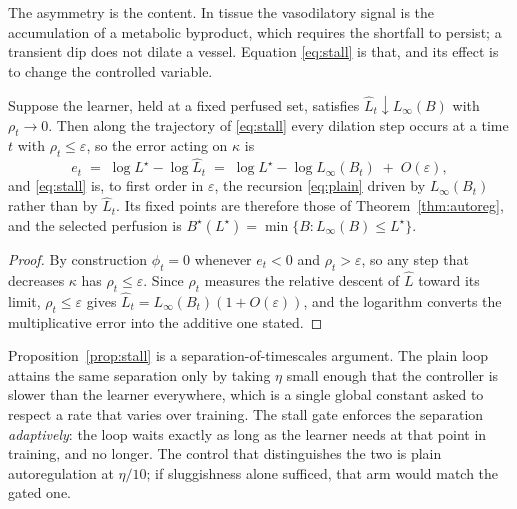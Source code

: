 The asymmetry is the content. In tissue the vasodilatory signal is the accumulation of a
metabolic byproduct, which requires the shortfall to persist; a transient dip does not
dilate a vessel. Equation \eqref{eq:stall} is that, and its effect is to change the
controlled variable.

\begin{proposition}
\label{prop:stall}
Suppose the learner, held at a fixed perfused set, satisfies
$\widehat{L}_t \downarrow L_\infty(B)$ with $\rho_t \to 0$. Then along the trajectory of
\eqref{eq:stall} every dilation step occurs at a time $t$ with $\rho_t \le
\varepsilon$, so the error acting on $\kappa$ is
\begin{equation}
  e_t \;=\; \log L^\star - \log \widehat{L}_t
  \;=\; \log L^\star - \log L_\infty(B_t) \;+\; O(\varepsilon),
\end{equation}
and \eqref{eq:stall} is, to first order in $\varepsilon$, the recursion
\eqref{eq:plain} driven by $L_\infty(B_t)$ rather than by $\widehat{L}_t$. Its fixed
points are therefore those of Theorem~\ref{thm:autoreg}, and the selected perfusion is
$B^\star(L^\star) = \min\{B : L_\infty(B) \le L^\star\}$.
\end{proposition}

\begin{proof}
By construction $\phi_t = 0$ whenever $e_t < 0$ and $\rho_t > \varepsilon$, so any step
that decreases $\kappa$ has $\rho_t \le \varepsilon$. Since $\rho_t$ measures the
relative descent of $\widehat{L}$ toward its limit, $\rho_t \le \varepsilon$ gives
$\widehat{L}_t = L_\infty(B_t)(1 + O(\varepsilon))$, and the logarithm converts the
multiplicative error into the additive one stated.
\end{proof}

\begin{remark}
\label{rem:timescales}
Proposition~\ref{prop:stall} is a separation-of-timescales argument. The plain loop
attains the same separation only by taking $\eta$ small enough that the controller is
slower than the learner everywhere, which is a single global constant asked to respect a
rate that varies over training. The stall gate enforces the separation \emph{adaptively}:
the loop waits exactly as long as the learner needs at that point in training, and no
longer. The control that distinguishes the two is plain autoregulation at
$\eta/10$; if sluggishness alone sufficed, that arm would match the gated one.
\end{remark}

